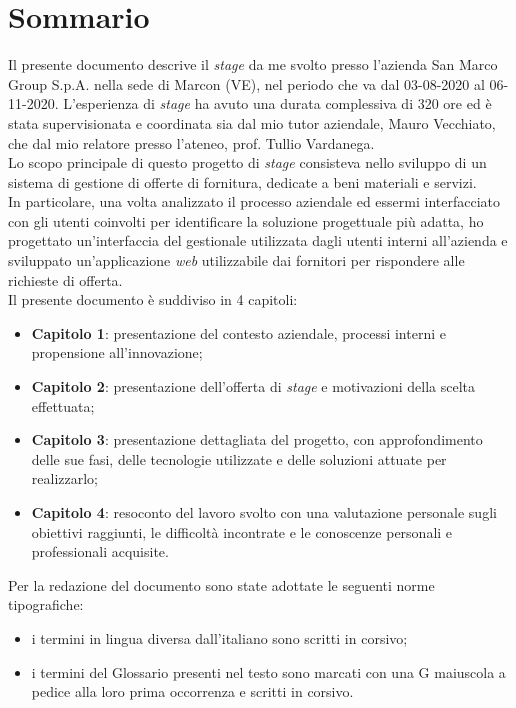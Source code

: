 
\cleardoublepage
{}
{}
\begingroup
\let\clearpage\relax
\let\cleardoublepage\relax
\let\cleardoublepage\relax

\chapter*{Sommario}

Il presente documento descrive il \textit{stage} da me svolto presso l'azienda San Marco Group S.p.A. nella sede di Marcon (VE), nel periodo che va dal 03-08-2020 al 06-11-2020. L'esperienza di \textit{stage} ha avuto una durata complessiva di 320 ore ed è stata supervisionata e coordinata sia dal mio tutor aziendale, Mauro Vecchiato, che dal mio relatore presso l'ateneo, prof. Tullio Vardanega.\\
Lo scopo principale di questo progetto di \textit{stage} consisteva nello sviluppo di un sistema di gestione di offerte di fornitura, dedicate a beni materiali e servizi.\\
In particolare, una volta analizzato il processo aziendale ed essermi interfacciato con gli utenti coinvolti per identificare la soluzione progettuale più adatta, ho progettato un'interfaccia del gestionale utilizzata dagli utenti interni all'azienda e sviluppato un'applicazione \textit{web} utilizzabile dai fornitori per rispondere alle richieste di offerta.\\
Il presente documento è suddiviso in 4 capitoli:
\begin{itemize}
	\item \textbf{Capitolo 1}: presentazione del contesto aziendale, processi interni e propensione all'innovazione;
	\item \textbf{Capitolo 2}: presentazione dell'offerta di \textit{stage} e motivazioni della scelta effettuata; 
	\item \textbf{Capitolo 3}: presentazione dettagliata del progetto, con approfondimento delle sue fasi, delle tecnologie utilizzate e delle soluzioni attuate per realizzarlo;
	\item \textbf{Capitolo 4}: resoconto del lavoro svolto con una valutazione personale sugli obiettivi raggiunti, le difficoltà incontrate e le conoscenze personali e professionali acquisite.
\end{itemize}
Per la redazione del documento sono state adottate le seguenti norme tipografiche:
\begin{itemize}
\item i termini in lingua diversa dall'italiano sono scritti in corsivo;
\item i termini del Glossario presenti nel testo sono marcati con una G maiuscola a
pedice alla loro prima occorrenza e scritti in corsivo.
\end{itemize}

\vfill
%
%

\endgroup			

\vfill

